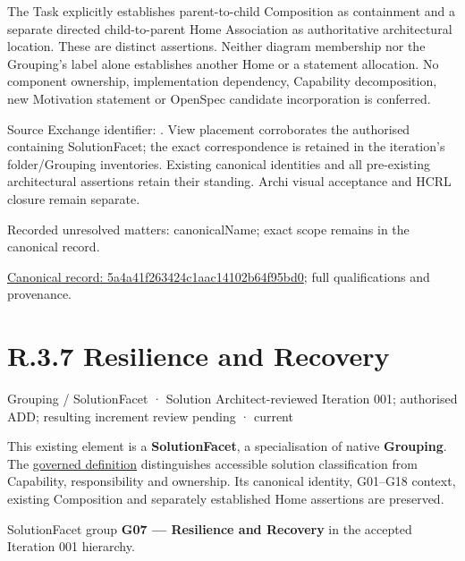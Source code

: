 The Task explicitly establishes parent-to-child Composition as containment and
a separate directed child-to-parent Home Association as authoritative architectural
location. These are distinct assertions. Neither diagram membership nor the
Grouping's label alone establishes another Home or a statement allocation.
No component ownership, implementation dependency, Capability decomposition,
new Motivation statement or OpenSpec candidate incorporation is conferred.



Source Exchange identifier: \texttt{}. View placement corroborates
the authorised containing SolutionFacet; the exact correspondence is retained in the
iteration's folder/Grouping inventories. Existing canonical identities and all
pre-existing architectural assertions retain their standing. Archi visual
acceptance and HCRL closure remain separate.


{\small Recorded unresolved matters: canonicalName; exact scope remains in the canonical record.}\par
{\footnotesize \href{../../../../../../../continuum/grouping/5a4a41f263424c1aac14102b64f95bd0.md}{Canonical record: 5a4a41f263424c1aac14102b64f95bd0}; full qualifications and provenance.}\par
\section*{R.3.7 Resilience and Recovery}
\label{navigation:R.3.7}

\label{element:914b8be39ecc4fb599e6bc0004c355c0}
{\small Grouping / SolutionFacet · Solution Architect-reviewed Iteration 001; authorised ADD; resulting increment review pending · current}\par

This existing element is a \textbf{SolutionFacet}, a specialisation of native
\textbf{Grouping}. The \href{\detokenize{../../../../../../../governance/continuum-representation.md#solutionfacet-classification--1119-candidate}}{governed definition}
distinguishes accessible solution classification from Capability, responsibility
and ownership. Its canonical identity, G01–G18 context, existing Composition
and separately established Home assertions are preserved.



SolutionFacet group \textbf{G07 — Resilience and Recovery} in the accepted Iteration 001 hierarchy.



